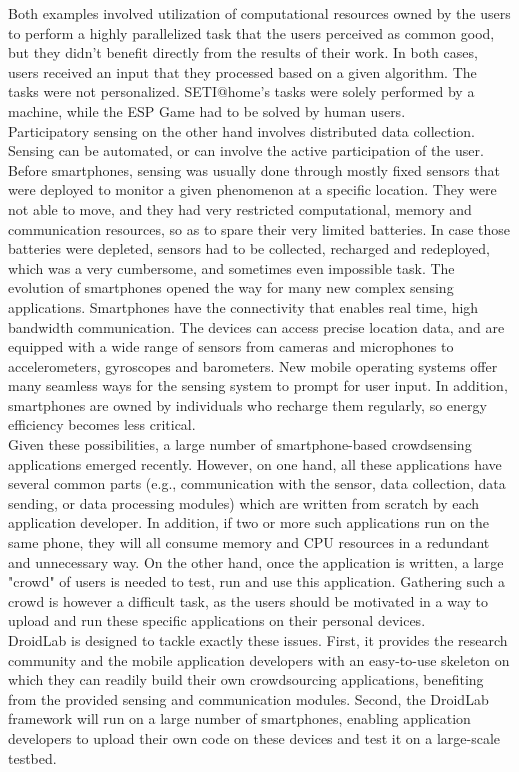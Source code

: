 \documentclass[conference,letterpaper]{IEEEtran}
\begin{document}
\indent Both examples involved utilization of computational resources owned by the users to perform a highly parallelized task that the users perceived as common good, but they didn't benefit directly from the results of their work. In both cases, users received an input that they processed based on a given algorithm. The tasks were not personalized. SETI@home's tasks were solely performed by a machine, while the ESP Game had to be solved by human users. \\
\indent Participatory sensing on the other hand involves distributed data collection. Sensing can be automated, or can involve the active participation of the user. Before smartphones, sensing was usually done through mostly fixed sensors that were deployed to monitor a given phenomenon at a specific location. They were not able to move, and they had very restricted computational, memory and communication resources, so as to spare their very limited batteries. In case those batteries were depleted, sensors had to be collected, recharged and redeployed, which was a very cumbersome, and sometimes even impossible task. The evolution of smartphones opened the way for many new complex sensing applications. Smartphones have the connectivity that enables real time, high bandwidth communication. The devices can access precise location data, and are equipped with a wide range of sensors from cameras and microphones to accelerometers, gyroscopes and barometers. New mobile operating systems offer many seamless ways for the sensing system to prompt for user input. In addition, smartphones are owned by individuals who recharge them regularly, so energy efficiency becomes less critical.\\
\indent Given these possibilities, a large number of smartphone-based crowdsensing applications emerged recently. However, on one hand, all these applications have several common parts (e.g., communication with the sensor, data collection, data sending, or data processing modules) which are written from scratch by each application developer. In addition, if two or more such applications run on the same phone, they will all consume memory and CPU resources in a redundant and unnecessary way. On the other hand, once the application is written, a large "crowd" of users is needed to test, run and use this application. Gathering such a crowd is however a difficult task, as the users should be motivated in a way to upload and run these specific applications on their personal devices.\\
\indent DroidLab is designed to tackle exactly these issues. First, it provides the research community and the mobile application developers with an easy-to-use skeleton on which they can readily build their own crowdsourcing applications, benefiting from the provided sensing and communication modules. Second, the DroidLab framework will run on a large number of smartphones, enabling application developers to upload their own code on these devices and test it on a large-scale testbed. 
\end{document}
